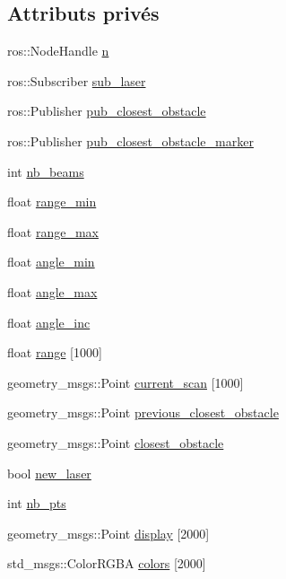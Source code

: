 \subsection*{Attributs privés}
\begin{DoxyCompactItemize}
\item 
ros\+::\+Node\+Handle \hyperlink{classobstacle__detection_af9d47d5799c2f8235a6b23e648017527}{n}
\item 
ros\+::\+Subscriber \hyperlink{classobstacle__detection_a6039f3306a252f69e94bdbbcd6b2586a}{sub\+\_\+laser}
\item 
ros\+::\+Publisher \hyperlink{classobstacle__detection_a8c385ba50b975608a9f7ca7dad292b14}{pub\+\_\+closest\+\_\+obstacle}
\item 
ros\+::\+Publisher \hyperlink{classobstacle__detection_a9a68c83350a4cdac4cda4f035b9fd53a}{pub\+\_\+closest\+\_\+obstacle\+\_\+marker}
\item 
int \hyperlink{classobstacle__detection_a165b85127bd657c5e02f64374ac99243}{nb\+\_\+beams}
\item 
float \hyperlink{classobstacle__detection_aa3b8ad63f9db233e9c54e3e793533c1e}{range\+\_\+min}
\item 
float \hyperlink{classobstacle__detection_a07b528b9821c2a024b6d4cf9a981f5cd}{range\+\_\+max}
\item 
float \hyperlink{classobstacle__detection_ad4d81d912a78379c7fa9d3bed5a46ba3}{angle\+\_\+min}
\item 
float \hyperlink{classobstacle__detection_ac2925fb29316055fb9ac63252df34e2d}{angle\+\_\+max}
\item 
float \hyperlink{classobstacle__detection_af11dfe5d4221ec764b2e0342bf140c96}{angle\+\_\+inc}
\item 
float \hyperlink{classobstacle__detection_ac8fac86b4054441a9aecc7d9453f4cd6}{range} \mbox{[}1000\mbox{]}
\item 
geometry\+\_\+msgs\+::\+Point \hyperlink{classobstacle__detection_abe28e799771603cfd242cff3cc8360e1}{current\+\_\+scan} \mbox{[}1000\mbox{]}
\item 
geometry\+\_\+msgs\+::\+Point \hyperlink{classobstacle__detection_a6619f1fc1e56dac5bf028c9dbab46773}{previous\+\_\+closest\+\_\+obstacle}
\item 
geometry\+\_\+msgs\+::\+Point \hyperlink{classobstacle__detection_a3fe5485079455a3179b0f30c2d29ac59}{closest\+\_\+obstacle}
\item 
bool \hyperlink{classobstacle__detection_afe40b9f71690dbb3595560e0f271c0b0}{new\+\_\+laser}
\item 
int \hyperlink{classobstacle__detection_ae1e9d58e1328625c5522e76faaa1b9d6}{nb\+\_\+pts}
\item 
geometry\+\_\+msgs\+::\+Point \hyperlink{classobstacle__detection_aa18bcd8cf14b32205e6716aec023e0f5}{display} \mbox{[}2000\mbox{]}
\item 
std\+\_\+msgs\+::\+Color\+R\+G\+BA \hyperlink{classobstacle__detection_a3ca3ada2b7bd7ea94c1ad2b53aa8b8f1}{colors} \mbox{[}2000\mbox{]}
\end{DoxyCompactItemize}


